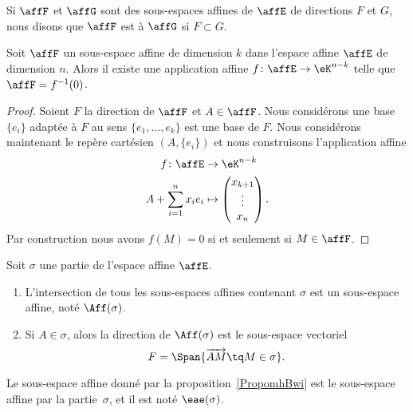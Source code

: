 Si \( \affF\) et \( \affG\) sont des sous-espaces affines de \( \affE\) de directions \( F\) et \( G\), nous disons que \( \affF\) est  à \( \affG\) si \( F\subset G\).

\begin{proposition}		\label{PROPooAAPZooDWCuTL}
	Soit \( \affF\) un sous-espace affine de dimension \( k\) dans l'espace affine \( \affE\) de dimension \( n\). Alors il existe une application affine \( f\colon \affE\to \eK^{n-k}\) telle que \( \affF=f^{-1}(0)\).
\end{proposition}

\begin{proof}
	Soient \( F\) la direction de \( \affF\) et \( A\in\affF\). Nous considérons une base \( \{ e_i \}\) adaptée à \( F\) au sens \( \{ e_1,\ldots, e_k \}\) est une base de \( F\). Nous considérons maintenant le repère cartésien \( (A,\{ e_i \})\) et nous construisons l'application affine
	\begin{equation}
		\begin{aligned}
			f\colon \affE        & \to \eK^{n-k}          \\
			A+\sum_{i=1}^nx_ie_i & \mapsto \begin{pmatrix}
				                               x_{k+1} \\
				                               \vdots  \\
				                               x_n
			                               \end{pmatrix}.
		\end{aligned}
	\end{equation}
	Par construction nous avons \( f(M)=0\) si et seulement si \( M\in\affF\).
\end{proof}

\begin{proposition}      \label{PropomhBwi}
	Soit \( \sigma\) une partie de l'espace affine \( \affE\).
	\begin{enumerate}
		\item
		      L'intersection de tous les sous-espaces affines contenant \( \sigma\) est un sous-espace affine, noté \( \Aff(\sigma)\).
		\item	\label{ITEMooNXXQooCxRUcz}
		      Si \( A\in \sigma\), alors la direction de \( \Aff(\sigma)\) est le sous-espace vectoriel
		      \begin{equation}        \label{EqnRAUfg}
			      F=\Span\{ \overrightarrow{ AM }\tq M\in \sigma \}.
		      \end{equation}
	\end{enumerate}
\end{proposition}
Le sous-espace affine donné par la proposition~\ref{PropomhBwi} est le sous-espace affine  par la partie~\( \sigma\), et il est noté \( \eae(\sigma)\). 

